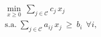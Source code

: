 \documentclass[preview]{standalone}
\begin{document}
\begin{align*}
\min_{x\ge 0}\ \sum_{j\in\mathcal{C}} c_j\,x_j\\\text{s.a.}\; \sum_{j\in\mathcal{C}} a_{ij}\,x_j\ \ge\ b_i\ \ \forall i,
\end{align*}
\end{document}
